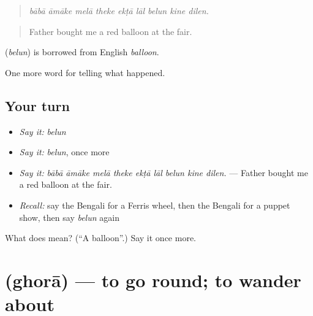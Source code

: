 \begin{quote}
        
\end{quote}

\begin{quote}
\emph{bābā āmāke melā theke ekṭā lāl belun kine dilen.}
\end{quote}

\begin{quote}
Father bought me a red balloon at the fair.
\end{quote}

\begin{cousinweb}
\textbf{} (\emph{belun}) is borrowed from English \emph{balloon}.
\end{cousinweb}

\begin{grammarlens}[title={What you've built}]
One more word for telling what happened.
\end{grammarlens}

\subsection*{Your turn}
\begin{itemize}
\raggedright
  \item \emph{Say it:} \emph{belun}
  \item \emph{Say it:} \emph{belun}, once more
  \item \emph{Say it:} \emph{bābā āmāke melā theke ekṭā lāl belun kine dilen.} — Father bought me a red balloon at the fair.
  \item \emph{Recall:} say the Bengali for a Ferris wheel, then the Bengali for a puppet show, then say \emph{belun} again
\end{itemize}

\begin{tcolorbox}[breakable,colback=teal!4,colframe=teal!35!black,title={Before you move on}]
What does  mean? (\textquotedblleft{}A balloon\textquotedblright{}.) Say it once more.
\end{tcolorbox}
\section[\texorpdfstring{\bn{ঘোরা} (ghorā)}{ঘোরা (ghorā)}]{ (ghorā) — to go round; to wander about}

\label{lesson:BN-C311-ghora}



